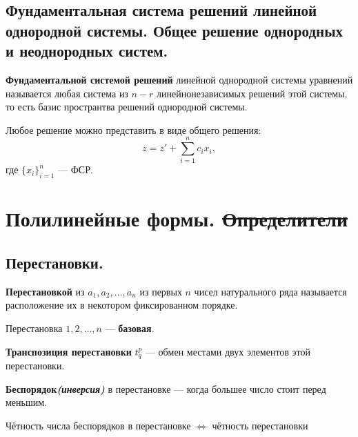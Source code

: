 \subsection{Фундаментальная система решений линейной однородной системы. Общее решение однородных и неоднородных систем.}
\begin{definition}
    \textbf{Фундаментальной системой решений} линейной однородной системы уравнений называется любая система из $n − r$ линейнонезависимых решений этой системы, то есть базис пространтва решений однородной системы.
\end{definition}
Любое решение можно представить в виде общего решения: $$z=z'+\sum\limits_{i=1}^n c_ix_i,$$ где $\{x_i\}_{i=1}^n$ --- ФСР.

\section{Полилинейные формы. \sout{Определители}}

\subsection{Перестановки.}
\begin{definition}
    \textbf{Перестановкой} из $a_1, a_2, \ldots , a_n$ из первых $n$ чисел натурального ряда называется расположение их в некотором фиксированном порядке.
\end{definition}
\begin{definition}
    Перестановка $1,2,\ldots, n$ --- \textbf{базовая}.
\end{definition}
\begin{definition}
    \textbf{Транспозиция перестановки} $t^p_q$ --- обмен местами двух элементов этой перестановки.
\end{definition}
\begin{definition}
    \textbf{Беспорядок\textit{(инверсия)}} в перестановке --- когда большее число стоит перед меньшим.
\end{definition}
\begin{definition}
    Чётность числа беспорядков в перестановке $\Leftrightarrow$ чётность перестановки
\end{definition}

